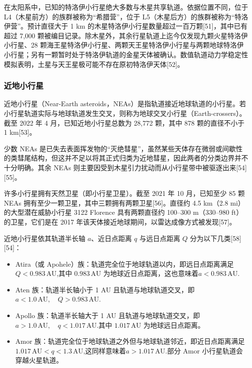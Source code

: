 在太阳系中，已知的特洛伊小行星绝大多数与木星共享轨道。依据位置不同，位于 L4（木星前方）的族群被称为“希腊营”，位于 L5（木星后方）的族群被称为“特洛伊营”。预计直径大于 1 km 的木星特洛伊小行星数量超过一百万颗[51]，其中已有超过 7{,}000 颗被编目记录。除木星外，其余行星轨道上迄今仅发现九颗火星特洛伊小行星、28 颗海王星特洛伊小行星、两颗天王星特洛伊小行星与两颗地球特洛伊小行星；另有一颗暂时处于特洛伊轨道的金星天体被确认。数值轨道动力学稳定性模拟表明，土星与天王星极可能不存在原初特洛伊天体[52]。
\subsubsection{近地小行星}
近地小行星（Near-Earth asteroids，NEAs）是指轨道接近地球轨道的小行星。若小行星轨道实际与地球轨道发生交叉，则称为地球交叉小行星（Earth-crossers）。截至 2022 年 4 月，已知近地小行星总数为 28{,}772 颗，其中 878 颗的直径不小于 1 km[53]。

少数 NEAs 是已失去表面挥发物的“灭绝彗星”，虽然某些天体存在微弱或间歇性的类彗尾结构，但这并不足以将其正式归类为近地彗星，因此两者的分类边界并不十分明确。其余 NEAs 则主要因受到木星引力扰动而从小行星带中被驱逐出来[54][55]。

许多小行星拥有天然卫星（即小行星卫星）。截至 2021 年 10 月，已知至少 85 颗 NEAs 拥有至少一颗卫星，其中三颗拥有两颗卫星[56]。直径约 4.5 km（2.8 mi）的大型潜在威胁小行星 3122 Florence 具有两颗直径约 100–300 m（330–980 ft）的卫星，它们是在 2017 年该天体接近地球期间，以雷达成像方式被发现[57]。

近地小行星依其轨道半长轴 \(a\)、近日点距离 \(q\) 与远日点距离 \(Q\) 分为以下几类[58][54]：
\begin{itemize}
\item Atira（或 Apohele）族：轨道完全位于地球轨道以内，即远日点距离满足\( Q < 0.983\,\mathrm{AU}\),其中 \(0.983\,\mathrm{AU}\) 为地球近日点距离，这也意味着\(a < 0.983\,\mathrm{AU}\).
\item Aten 族：轨道半长轴小于 1 AU 且轨道与地球轨道交叉，即\(a < 1.0\,\mathrm{AU},\quad Q > 0.983\,\mathrm{AU}\).
\item Apollo 族：轨道半长轴大于 1 AU 且轨道与地球轨道交叉，即\(a > 1.0\,\mathrm{AU},\quad q < 1.017\,\mathrm{AU}\).其中 \(1.017\,\mathrm{AU}\) 为地球远日点距离。
\item Amor 族：轨道完全位于地球轨道之外但与地球轨道邻近，即近日点距离满足\(1.017\,\mathrm{AU} < q < 1.3\,\mathrm{AU}\),这同样意味着\(a > 1.017\,\mathrm{AU}\).部分 Amor 小行星轨道会穿越火星轨道。
\end{itemize}
